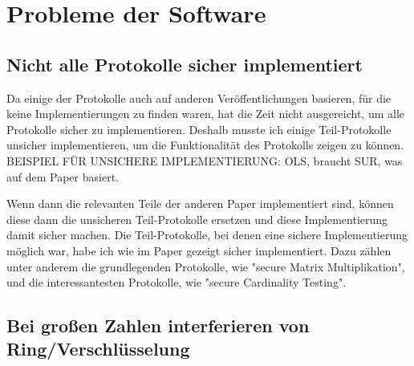 \chapter{Probleme der Software}

\section{Nicht alle Protokolle sicher implementiert}
Da einige der Protokolle auch auf anderen Veröffentlichungen basieren, für die keine Implementierungen zu finden waren, hat die Zeit nicht ausgereicht, um alle Protokolle sicher zu implementieren. Deshalb musste ich einige Teil-Protokolle unsicher implementieren, um die Funktionalität des Protokolls zeigen zu können.\\
BEISPIEL  FÜR UNSICHERE IMPLEMENTIERUNG:
OLS, braucht SUR, was auf dem Paper \cite{tcc-2007-3673} basiert.

Wenn dann die relevanten Teile der anderen Paper implementiert sind, können diese dann die unsicheren Teil-Protokolle ersetzen und diese Implementierung damit sicher machen.
Die Teil-Protokolle, bei denen eine sichere Implementierung möglich war, habe ich wie im Paper gezeigt sicher implementiert. Dazu zählen unter anderem die grundlegenden Protokolle, wie "secure Matrix Multiplikation", und die interessantesten Protokolle, wie "secure Cardinality Testing".\\


\section{Bei großen Zahlen interferieren von Ring/Verschlüsselung}